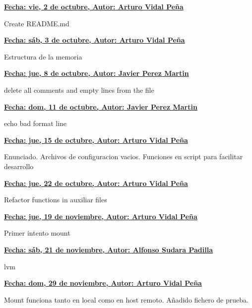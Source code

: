 \item \textbf{\underline{\underline{Fecha:} vie,  2 de octubre, \underline{Autor:} Arturo Vidal Peña}}\\\item[] Create README.md\\
\item \textbf{\underline{\underline{Fecha:} sáb,  3 de octubre, \underline{Autor:} Arturo Vidal Peña}}\\\item[] Estructura de la memoria\\
\item \textbf{\underline{\underline{Fecha:} jue,  8 de octubre, \underline{Autor:} Javier Perez Martin}}\\\item[] delete all comments and empty lines from the file\\
\item \textbf{\underline{\underline{Fecha:} dom, 11 de octubre, \underline{Autor:} Javier Perez Martin}}\\\item[] echo bad format line\\
\item \textbf{\underline{\underline{Fecha:} jue, 15 de octubre, \underline{Autor:} Arturo Vidal Peña}}\\\item[] Enunciado. Archivos de configuracion vacios. Funciones en script para facilitar desarrollo\\
\item \textbf{\underline{\underline{Fecha:} jue, 22 de octubre, \underline{Autor:} Arturo Vidal Peña}}\\\item[] Refactor functions in auxiliar files\\
\item \textbf{\underline{\underline{Fecha:} jue, 19 de noviembre, \underline{Autor:} Arturo Vidal Peña}}\\\item[] Primer intento mount\\
\item \textbf{\underline{\underline{Fecha:} sáb, 21 de noviembre, \underline{Autor:} Alfonso Sudara Padilla}}\\\item[] lvm\\
\item \textbf{\underline{\underline{Fecha:} dom, 29 de noviembre, \underline{Autor:} Arturo Vidal Peña}}\\\item[] Mount funciona tanto en local como en host remoto. Añadido fichero de prueba.\\
